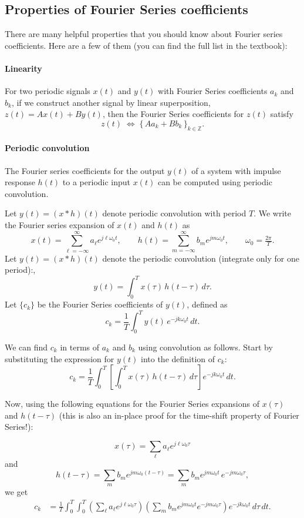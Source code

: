 \documentclass{ee102_notes}
\begin{document}
\subsection{Properties of Fourier Series coefficients}
There are many helpful properties that you should know about Fourier series coefficients. Here are a few of them (you can find the full list in the textbook):

\paragraph{Linearity}

For two periodic signals $x(t)$ and $y(t)$ with Fourier Series coefficients $a_k$ and $b_k$, if we construct another signal by linear superposition, $z(t)=A x(t)+B y(t)$, then the Fourier Series coefficients for $z(t)$ satisfy
\[
z(t)\;\Longleftrightarrow\; \{\,A a_k + B b_k\,\}_{k\in\mathbb{Z}}.
\]

\paragraph{Periodic convolution}
The Fourier series coefficients for the output $y(t)$ of a system with impulse response $h(t)$ to a periodic input $x(t)$ can be computed using periodic convolution.

Let $y(t)=(x*h)(t)$ denote periodic convolution with period $T$.
We write the Fourier series expansion of $x(t)$ and $h(t)$ as
\[
x(t)=\sum_{\ell=-\infty}^{\infty} a_\ell e^{j\ell\omega_0 t},
\qquad
h(t)=\sum_{m=-\infty}^{\infty} b_m e^{jm\omega_0 t},
\qquad \omega_0=\tfrac{2\pi}{T}.
\]
Let $y(t)=(x*h)(t)$ denote the periodic convolution (integrate only for one period):,
\[
y(t)=\int_{0}^{T} x(\tau)\,h(t-\tau)\,d\tau .
\]
Let $\{c_k\}$ be the Fourier Series coefficients of $y(t)$, defined as
\[
c_k=\frac1T \int_{0}^{T} y(t)\,e^{-jk\omega_0 t}\,dt .
\]

We can find $c_k$ in terms of $a_k$ and $b_k$ using convolution as follows. Start by substituting the expression for $y(t)$ into the definition of $c_k$:
\[
c_k=\frac1T\int_{0}^{T} \left[\int_{0}^{T} x(\tau)\,h(t-\tau)\,d\tau\right]
e^{-jk\omega_0 t}\,dt .
\]

Now, using the following equations for the Fourier Series expansions of $x(\tau)$ and $h(t-\tau)$ (this is also an in-place proof for the time-shift property of Fourier Series!):

\[
x(\tau)=\sum_{\ell} a_\ell e^{j\ell\omega_0 \tau}
\]
and
\[
h(t-\tau)=\sum_{m} b_m e^{jm\omega_0 (t-\tau)}
= \sum_{m} b_m e^{jm\omega_0 t}\,e^{-jm\omega_0 \tau},
\]
we get
\[
\begin{aligned}
c_k
&=\frac1T\int_{0}^{T}\!\!\int_{0}^{T}
\left(\sum_{\ell} a_\ell e^{j\ell\omega_0 \tau}\right)
\left(\sum_{m} b_m e^{jm\omega_0 t}e^{-jm\omega_0 \tau}\right)
e^{-jk\omega_0 t}\,d\tau\,dt .
\end{aligned}
\]
\end{document}
